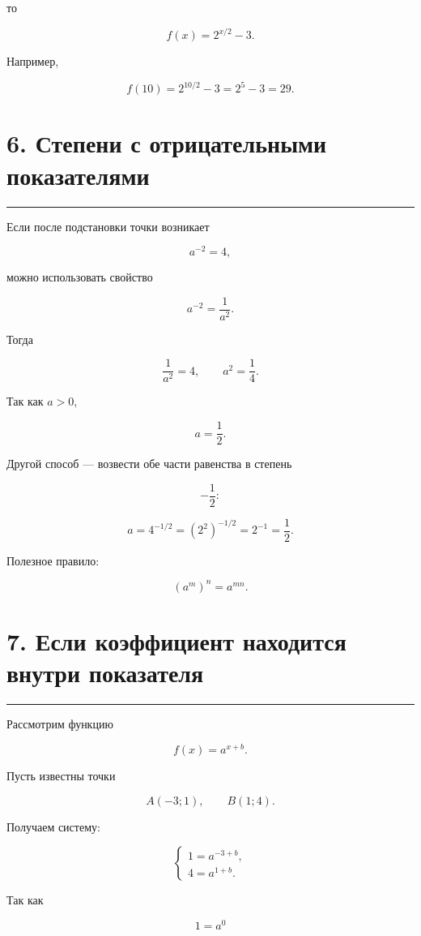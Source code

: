 \documentclass[a4paper,12pt]{article}
\newcommand{\sectionline}{%
    \vspace{0.2em}
    {\color{accent}\rule{\linewidth}{0.7pt}}
    \vspace{0.45em}
}
\begin{document}
то

\[
f(x)=2^{x/2}-3.
\]

Например,

\[
f(10)=2^{10/2}-3
=2^5-3
=29.
\]

\section*{\textcolor{darkaccent}{6. Степени с отрицательными показателями}}

\sectionline

Если после подстановки точки возникает

\[
a^{-2}=4,
\]

можно использовать свойство

\[
a^{-2}=\frac1{a^2}.
\]

Тогда

\[
\frac1{a^2}=4,
\qquad
a^2=\frac14.
\]

Так как \(a>0\),

\[
\boxed{a=\frac12}.
\]

Другой способ --- возвести обе части равенства в степень

\[
-\frac12:
\]

\[
a
=
4^{-1/2}
=
\left(2^2\right)^{-1/2}
=
2^{-1}
=
\frac12.
\]

Полезное правило:

\[
\boxed{(a^m)^n=a^{mn}}.
\]


\section*{\textcolor{darkaccent}{7. Если коэффициент находится внутри показателя}}

\sectionline

Рассмотрим функцию

\[
f(x)=a^{x+b}.
\]

Пусть известны точки

\[
A(-3;1),
\qquad
B(1;4).
\]

Получаем систему:

\[
\begin{cases}
1=a^{-3+b},\\
4=a^{1+b}.
\end{cases}
\]

Так как

\[
1=a^0
\]
\end{document}
